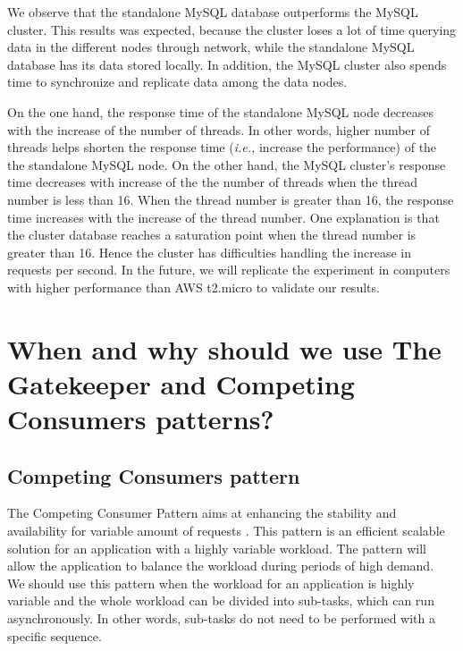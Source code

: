 \documentclass{article}
\begin{document}
We observe that the standalone MySQL database outperforms the MySQL cluster. This results was expected, because the cluster loses a lot of time querying data in the different nodes through network, while the standalone MySQL database has its data stored locally. In addition, the MySQL cluster also spends time to synchronize and replicate data among the data nodes.

On the one hand, the response time of the standalone MySQL node decreases with the increase of the number of threads. In other words, higher number of threads helps shorten the response time (\emph{i.e.,} increase the performance) of the the standalone MySQL node. On the other hand, the MySQL cluster's response time decreases with increase of the the number of threads when the thread number is less than 16. When the thread number is greater than 16, the response time increases with the increase of the thread number. One explanation is that the cluster database reaches a saturation point when the thread number is greater than 16. Hence the cluster has difficulties handling the increase in requests per second. In the future, we will replicate the experiment in computers with higher performance than AWS t2.micro to validate our results.
  

\section{When and why should we use The Gatekeeper and Competing Consumers patterns?}\label{Q2}
\subsection{Competing Consumers pattern}
The Competing Consumer Pattern aims at enhancing the stability and availability for variable amount of requests \cite{homer2014cloud}. This pattern is an efficient scalable solution for an application with a highly variable workload. The pattern will allow the application to balance the workload during periods of high demand.\\

We should use this pattern when the workload for an application is highly variable and the whole workload can be divided into sub-tasks, which can run asynchronously. In other words, sub-tasks do not need to be performed with a specific sequence. \cite{homer2014cloud}\\
\end{document}
